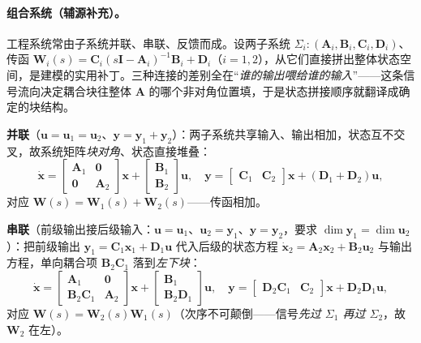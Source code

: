 \paragraph{组合系统（辅源补充）。}
工程系统常由子系统并联、串联、反馈而成。设两子系统 $\Sigma_i:(\mathbf{A}_i,\mathbf{B}_i,\mathbf{C}_i,\mathbf{D}_i)$、传函 $\mathbf{W}_i(s)=\mathbf{C}_i(s\mathbf{I}-\mathbf{A}_i)^{-1}\mathbf{B}_i+\mathbf{D}_i$（$i=1,2$），从它们直接拼出整体状态空间，是建模的实用补丁\cite{liubao2006modern,zhang2017modern}。三种连接的差别全在“\emph{谁的输出喂给谁的输入}”——这条信号流向决定耦合块往整体 $\mathbf{A}$ 的哪个非对角位置填，于是状态拼接顺序就翻译成确定的块结构。

\noindent \textbf{并联}（$\mathbf{u}=\mathbf{u}_1=\mathbf{u}_2$、$\mathbf{y}=\mathbf{y}_1+\mathbf{y}_2$）：两子系统共享输入、输出相加，状态互不交叉，故系统矩阵\emph{块对角}、状态直接堆叠：
\begin{equation}
  \dot{\mathbf{x}}=\begin{bmatrix}\mathbf{A}_1&\mathbf{0}\\\mathbf{0}&\mathbf{A}_2\end{bmatrix}\mathbf{x}+\begin{bmatrix}\mathbf{B}_1\\\mathbf{B}_2\end{bmatrix}\mathbf{u},\quad
  \mathbf{y}=\begin{bmatrix}\mathbf{C}_1&\mathbf{C}_2\end{bmatrix}\mathbf{x}+(\mathbf{D}_1+\mathbf{D}_2)\mathbf{u},
  \label{eq:ssb-parallel}
\end{equation}
对应 $\mathbf{W}(s)=\mathbf{W}_1(s)+\mathbf{W}_2(s)$——传函相加。

\noindent \textbf{串联}（前级输出接后级输入：$\mathbf{u}=\mathbf{u}_1$、$\mathbf{u}_2=\mathbf{y}_1$、$\mathbf{y}=\mathbf{y}_2$，要求 $\dim\mathbf{y}_1=\dim\mathbf{u}_2$）：把前级输出 $\mathbf{y}_1=\mathbf{C}_1\mathbf{x}_1+\mathbf{D}_1\mathbf{u}$ 代入后级的状态方程 $\dot{\mathbf{x}}_2=\mathbf{A}_2\mathbf{x}_2+\mathbf{B}_2\mathbf{u}_2$ 与输出方程，单向耦合项 $\mathbf{B}_2\mathbf{C}_1$ 落到\emph{左下块}：
\begin{equation}
  \dot{\mathbf{x}}=\begin{bmatrix}\mathbf{A}_1&\mathbf{0}\\\mathbf{B}_2\mathbf{C}_1&\mathbf{A}_2\end{bmatrix}\mathbf{x}+\begin{bmatrix}\mathbf{B}_1\\\mathbf{B}_2\mathbf{D}_1\end{bmatrix}\mathbf{u},\quad
  \mathbf{y}=\begin{bmatrix}\mathbf{D}_2\mathbf{C}_1&\mathbf{C}_2\end{bmatrix}\mathbf{x}+\mathbf{D}_2\mathbf{D}_1\mathbf{u},
  \label{eq:ssb-conn-series}
\end{equation}
对应 $\mathbf{W}(s)=\mathbf{W}_2(s)\mathbf{W}_1(s)$（次序不可颠倒——信号\emph{先过 $\Sigma_1$ 再过 $\Sigma_2$}，故 $\mathbf{W}_2$ 在左）。

